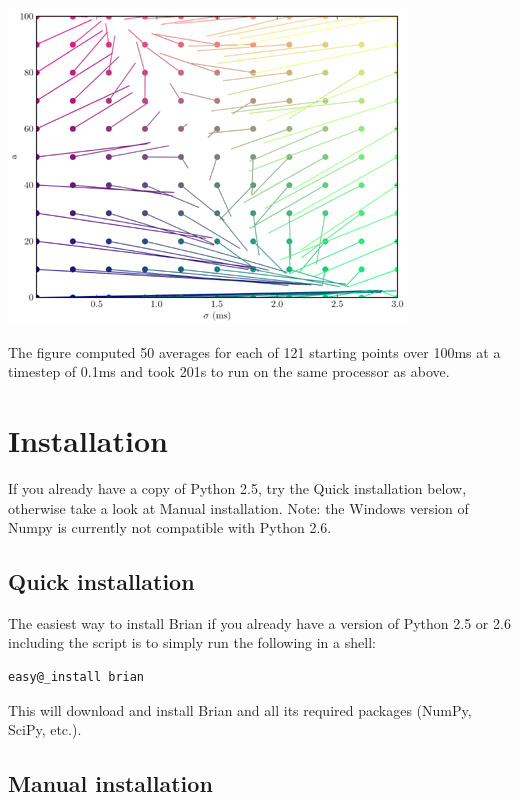 \documentclass[letterpaper,10pt,english]{manual}
\begin{document}
\includegraphics{sfc-statespace.jpg}

The figure computed 50 averages for each of 121 starting points over 100ms at a timestep of 0.1ms and took
201s to run on the same processor as above.

\resetcurrentobjects
\hypertarget{--doc-installation}{}

\chapter{Installation}

If you already have a copy of Python 2.5, try the Quick installation below,
otherwise take a look at Manual installation.
Note: the Windows version of Numpy is currently not compatible with Python 2.6.


\section{Quick installation}

The easiest way to install Brian if you already have a version of Python 2.5 or 2.6 including the
 script is to simply run the following in a shell:

\begin{Verbatim}[commandchars=@\[\]]
easy@_install brian
\end{Verbatim}

This will download and install Brian and all its required packages (NumPy, SciPy, etc.).


\section{Manual installation}
\end{document}
